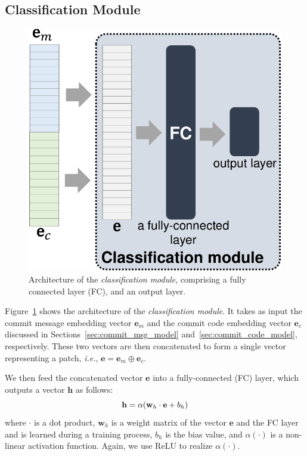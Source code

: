 \subsection{Classification Module}
\label{sec:classification_model}

\begin{figure}[t!]
	\center
	\includegraphics[scale=0.4]{figures/classification_module.pdf}
	\caption{Architecture of the \textit{classification module}, comprising a fully connected layer (FC), and an output layer.}
	\label{fig:clf_module}
    \vspace{-0.4cm}
\end{figure}


Figure~\ref{fig:clf_module} shows the architecture of the \textit{classification module}. It takes as input the commit message embedding vector $\mathbf{e}_m$ and the commit code embedding vector $\mathbf{e}_c$ discussed in Sections~\ref{sec:commit_msg_model} and~\ref{sec:commit_code_model}, respectively.
These two vectors are then concatenated to form a single vector representing a patch,
{\em i.e.}, $\textbf{e} = \mathbf{e}_m \oplus \mathbf{e}_c$.

We then feed the concatenated vector $\mathbf{e}$ into a fully-connected
(FC) layer, which outputs a vector
$\mathbf{h}$ as follows:
\begin{equation}  \footnotesize
\label{eq:fully_layer}
\mathbf{h} = \alpha(\mathbf{w}_h \cdot \mathbf{e} + b_h)
\end{equation}
where $\cdot$ is a dot product, 
$\textbf{w}_h$ is a weight matrix of the vector $\mathbf{e}$ and the FC layer and is learned during a training process,  
$b_h$ is the bias value, and $\alpha(\cdot)$ is a non-linear
activation function. Again, we use ReLU to realize $\alpha(\cdot)$.

